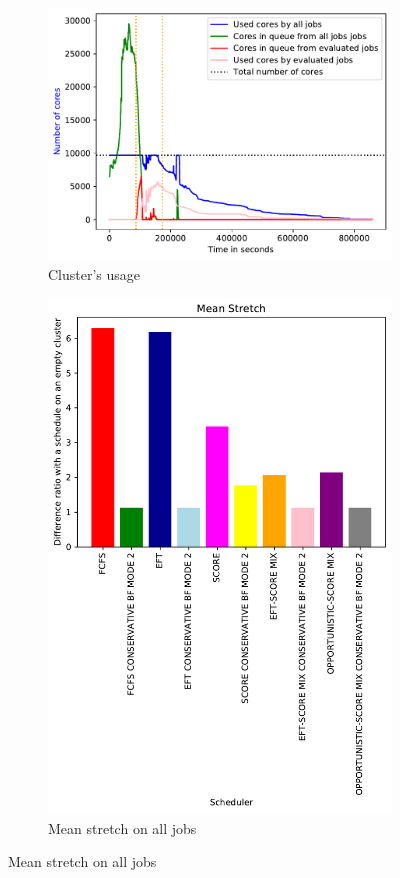 \documentclass[a4paper]{article}
\begin{document}
\begin{figure}[H]\centering
\begin{subfigure}[b]{0.4\linewidth}\centering\includegraphics[width=1\linewidth]{MBSS/plot/2022-01-21->2022-01-21_V9271_Fcfs_Used_nodes_450_128_32_256_4_1024.pdf}\caption{Cluster's usage}\end{subfigure}
\begin{subfigure}[b]{0.4\linewidth}\centering\includegraphics[width=0.9\linewidth]{MBSS/plot/Results_FCFS_Score_Backfill_2022-01-21->2022-01-21_V9271_Mean_Stretch_450_128_32_256_4_1024.pdf}\caption{Mean stretch on all jobs}\end{subfigure}

\end{figure}
\end{document}
